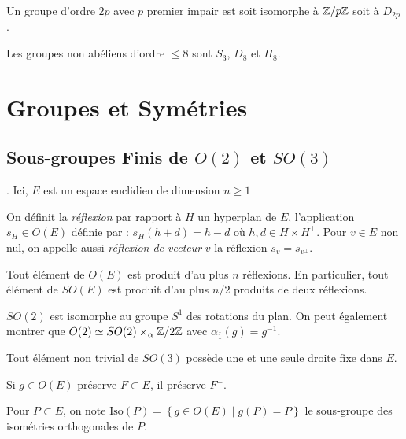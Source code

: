 \documentclass{cours}
\begin{document}
\begin{proposition}
    Un groupe d'ordre $2p$ avec $p$ premier impair est soit isomorphe à $\mathbb{Z}/p\mathbb{Z}$ soit à $D_{2p}$.
\end{proposition}

\begin{proposition}
    Les groupes non abéliens d'ordre $\leq 8$ sont $S_{3}$, $D_{8}$ et $H_{8}$.
\end{proposition}

\newpage
\section{Groupes et Symétries}
\subsection{Sous-groupes Finis de $O(2)$ et $SO(3)$}.
Ici, $E$ est un espace euclidien de dimension $n \geq 1$
\begin{definition}
    On définit la \emph{réflexion} par rapport à $H$ un hyperplan de $E$, l'application $s_{H} \in O(E)$ définie par : $s_{H}(h + d) = h - d$ où $h, d \in H \times H^{\perp}$. Pour $v \in E$ non nul, on appelle aussi \emph{réflexion de vecteur } $v$ la réflexion $s_{v} = s_{v^{\perp}}$.
\end{definition}

\begin{theorem} 
    Tout élément de $O(E)$ est produit d'au plus $n$ réflexions. En particulier, tout élément de $SO(E)$ est produit d'au plus $n/2$ produits de deux réflexions.   
\end{theorem}
\begin{remark}
    $SO(2)$ est isomorphe au groupe $S^{1}$ des rotations du plan. On peut également montrer que $O(2) \simeq SO(2) \rtimes_{\alpha} \mathbb{Z}/2\mathbb{Z}$ avec $\alpha_{\bar{1}}(g) = g^{-1}$.
\end{remark}

\begin{corollary}
    Tout élément non trivial de $SO(3)$ possède une et une seule droite fixe dans $E$.
\end{corollary}

\begin{lemma}
    Si $g\in O(E)$ préserve $F \subset E$, il préserve $F^{\perp}$.
\end{lemma}

\begin{definition}
    Pour $P \subset E$, on note $\text{Iso}(P) = \left\{g \in O(E) \mid g(P) = P\right\}$ le sous-groupe des isométries orthogonales de $P$.
\end{definition}
\end{document}
